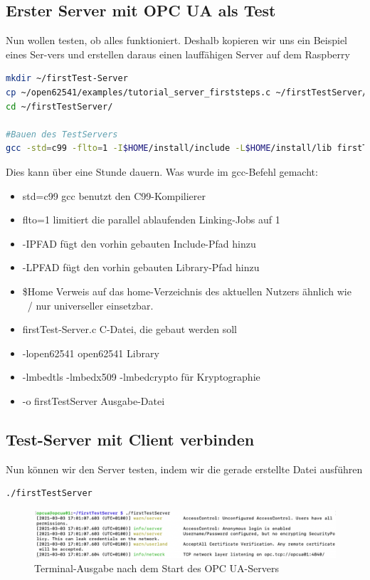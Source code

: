 \subsection{Erster Server mit OPC UA als Test}
Nun wollen testen, ob alles funktioniert. Deshalb kopieren wir uns ein Beispiel eines Ser-vers und erstellen daraus einen lauffähigen Server auf dem Raspberry
\begin{lstlisting}[language=Bash]
mkdir ~/firstTest-Server
cp ~/open62541/examples/tutorial_server_firststeps.c ~/firstTestServer/firstTestServer.c
cd ~/firstTestServer/

#Bauen des TestServers
gcc -std=c99 -flto=1 -I$HOME/install/include -L$HOME/install/lib firstTestServer.c -lopen62541 -lmbedtls -lmbedx509 -lmbedcrypto -o firstTestServer
\end{lstlisting}
Dies kann über eine Stunde dauern.
Was wurde im gcc-Befehl gemacht:
\begin{itemize}
	\item std=c99 gcc benutzt den C99-Kompilierer
	\item flto=1 limitiert die parallel ablaufenden Linking-Jobs auf 1
	\item -I{PFAD} fügt den vorhin gebauten Include-Pfad hinzu
	\item -L{PFAD} fügt den vorhin gebauten Library-Pfad hinzu
	\item \$Home Verweis auf das home-Verzeichnis des aktuellen Nutzers ähnlich wie ~/ nur universeller einsetzbar.
	\item firstTest-Server.c  C-Datei, die gebaut werden soll
	\item -lopen62541 open62541 Library
	\item -lmbedtls -lmbedx509 -lmbedcrypto für Kryptographie
	\item -o firstTestServer Ausgabe-Datei
\end{itemize}

\subsection{Test-Server mit Client verbinden}
Nun können wir den Server testen, indem wir die gerade erstellte Datei ausführen
\begin{lstlisting}[language=Bash]
./firstTestServer
\end{lstlisting}
\begin{figure}[H]
	\centering
	\includegraphics[width=1\linewidth]{abb/TerminaNachServerStart}
	\caption{Terminal-Ausgabe nach dem Start des OPC UA-Servers}
	\label{fig:terminanachserverstart}
\end{figure}


